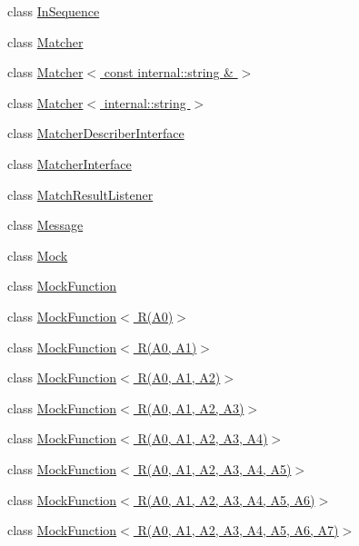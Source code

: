 \begin{DoxyCompactItemize}
class \hyperlink{classtesting_1_1InSequence}{In\+Sequence}
\item 
class \hyperlink{classtesting_1_1Matcher}{Matcher}
\item 
class \hyperlink{classtesting_1_1Matcher_3_01const_01internal_1_1string_01_6_01_4}{Matcher$<$ const internal\+::string \& $>$}
\item 
class \hyperlink{classtesting_1_1Matcher_3_01internal_1_1string_01_4}{Matcher$<$ internal\+::string $>$}
\item 
class \hyperlink{classtesting_1_1MatcherDescriberInterface}{Matcher\+Describer\+Interface}
\item 
class \hyperlink{classtesting_1_1MatcherInterface}{Matcher\+Interface}
\item 
class \hyperlink{classtesting_1_1MatchResultListener}{Match\+Result\+Listener}
\item 
class \hyperlink{classtesting_1_1Message}{Message}
\item 
class \hyperlink{classtesting_1_1Mock}{Mock}
\item 
class \hyperlink{classtesting_1_1MockFunction}{Mock\+Function}
\item 
class \hyperlink{classtesting_1_1MockFunction_3_01R_07A0_08_4}{Mock\+Function$<$ R(\+A0)$>$}
\item 
class \hyperlink{classtesting_1_1MockFunction_3_01R_07A0_00_01A1_08_4}{Mock\+Function$<$ R(\+A0, A1)$>$}
\item 
class \hyperlink{classtesting_1_1MockFunction_3_01R_07A0_00_01A1_00_01A2_08_4}{Mock\+Function$<$ R(\+A0, A1, A2)$>$}
\item 
class \hyperlink{classtesting_1_1MockFunction_3_01R_07A0_00_01A1_00_01A2_00_01A3_08_4}{Mock\+Function$<$ R(\+A0, A1, A2, A3)$>$}
\item 
class \hyperlink{classtesting_1_1MockFunction_3_01R_07A0_00_01A1_00_01A2_00_01A3_00_01A4_08_4}{Mock\+Function$<$ R(\+A0, A1, A2, A3, A4)$>$}
\item 
class \hyperlink{classtesting_1_1MockFunction_3_01R_07A0_00_01A1_00_01A2_00_01A3_00_01A4_00_01A5_08_4}{Mock\+Function$<$ R(\+A0, A1, A2, A3, A4, A5)$>$}
\item 
class \hyperlink{classtesting_1_1MockFunction_3_01R_07A0_00_01A1_00_01A2_00_01A3_00_01A4_00_01A5_00_01A6_08_4}{Mock\+Function$<$ R(\+A0, A1, A2, A3, A4, A5, A6)$>$}
\item 
class \hyperlink{classtesting_1_1MockFunction_3_01R_07A0_00_01A1_00_01A2_00_01A3_00_01A4_00_01A5_00_01A6_00_01A7_08_4}{Mock\+Function$<$ R(\+A0, A1, A2, A3, A4, A5, A6, A7)$>$}

\end{DoxyCompactItemize}
